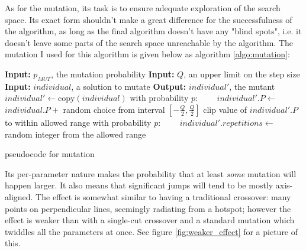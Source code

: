 \documentclass[times, utf8, diplomski]{fer}
\begin{document}
As for the mutation, its task is to ensure adequate exploration of the search
space. Its exact form shouldn't make a great difference for the successfulness
of the algorithm, as long as the final algorithm doesn't have any "blind spots",
i.e. it doesn't leave some parts of the search space unreachable by the algorithm.
The mutation I used for this algorithm is given below as algorithm \ref{algo:mutation}:

\begin{algorithm}[hb]
    \small
    \begin{algorithmic}[1]
        \STATE \textbf{Input:} $p_{MUT}$, the mutation probability
        \STATE \textbf{Input:} $Q$, an upper limit on the step size
        \STATE \textbf{Input:} $individual$, a solution to mutate
        \STATE \textbf{Output:} $individual'$, the mutant
        \STATE $individual' \gets \text{copy}(individual)$
            \STATE with probability $p$:
            \STATE ~~~~$individual'.P \gets $ $individual.P + $ random choice from interval $[-\frac{Q}{2}, \frac{Q}{2}]$
            \STATE clip value of $individual'.P$ to within allowed range
        \ENDFOR
        \STATE with probability $p$:
        \STATE ~~~~$individual'.repetitions \gets $ random integer from the allowed range
    \end{algorithmic}
    \caption{pseudocode for mutation}
    \label{algo:mutation}
\end{algorithm}


Its per-parameter nature makes the probability that at least \emph{some} mutation
will happen larger. It also means that significant jumps will tend to be mostly
axis-aligned. The effect is somewhat similar to having a traditional crossover:
many points on perpendicular lines, seemingly radiating from a hotspot; however
the effect is weaker than with a single-cut crossover and a standard mutation
which twiddles all the parameters at once. See figure \ref{fig:weaker_effect}
for a picture of this.
\end{document}
